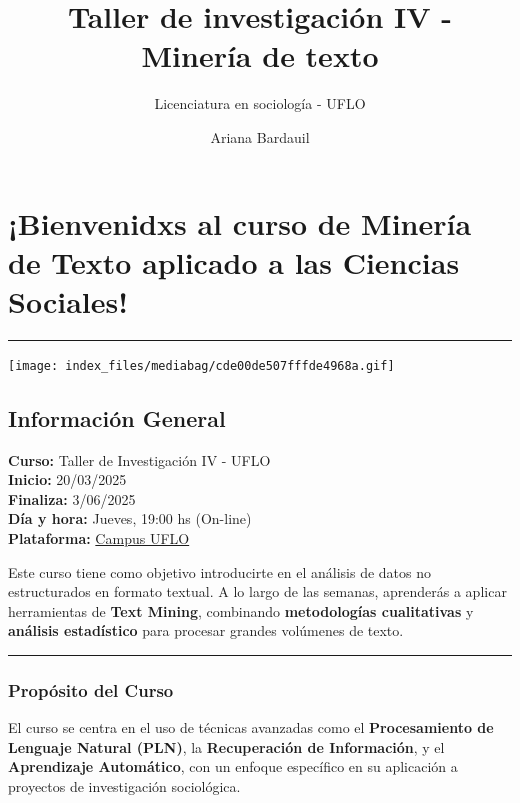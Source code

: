 \documentclass[
  letterpaper,
  DIV=11,
  numbers=noendperiod]{scrreprt}
\title{Taller de investigación IV - Minería de texto}
\subtitle{Licenciatura en sociología - UFLO}
\author{Ariana Bardauil}
\date{}
\renewcommand*\contentsname{Table of contents}
\newcommand\contentsname{Table of contents}
\begin{document}
\maketitle

\renewcommand*\contentsname{Table of contents}
{
\hypersetup{linkcolor=}
\setcounter{tocdepth}{2}
\tableofcontents
}


\chapter{¡Bienvenidxs al curso de Minería de Texto aplicado a las
Ciencias
Sociales!}\label{bienvenidxs-al-curso-de-mineruxeda-de-texto-aplicado-a-las-ciencias-sociales}

\begin{center}\rule{0.5\linewidth}{0.5pt}\end{center}

\texttt{[image: index\_files/mediabag/cde00de507fffde4968a.gif]}\hfill

\section{Información General}\label{informaciuxf3n-general}

\textbf{Curso:} Taller de Investigación IV - UFLO\\
\textbf{Inicio:} 20/03/2025\\
\textbf{Finaliza:} 3/06/2025\\
\textbf{Día y hora:} Jueves, 19:00 hs (On-line)\\
\textbf{Plataforma:} \href{https://campus.uflo.edu.ar/}{Campus UFLO}

Este curso tiene como objetivo introducirte en el análisis de datos no
estructurados en formato textual. A lo largo de las semanas, aprenderás
a aplicar herramientas de \textbf{Text Mining}, combinando
\textbf{metodologías cualitativas} y \textbf{análisis estadístico} para
procesar grandes volúmenes de texto.

\begin{center}\rule{0.5\linewidth}{0.5pt}\end{center}

\subsection{Propósito del Curso}\label{propuxf3sito-del-curso}

El curso se centra en el uso de técnicas avanzadas como el
\textbf{Procesamiento de Lenguaje Natural (PLN)}, la
\textbf{Recuperación de Información}, y el \textbf{Aprendizaje
Automático}, con un enfoque específico en su aplicación a proyectos de
investigación sociológica.
\end{document}
